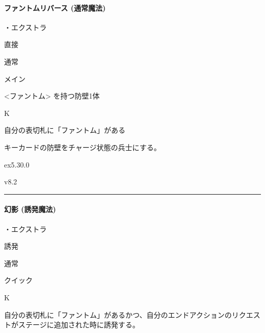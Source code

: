 \documentclass[letterpaper,10pt,dvipdfmx]{sphinxmanual}
\begin{document}
\paragraph{ファントムリバース (通常魔法)}
\label{\detokenize{auto/frameActionlist:act-phantomreverse}}\label{\detokenize{auto/frameActionlist:id42}}
\sphinxAtStartPar
{}

\sphinxAtStartPar
・エクストラ

\sphinxAtStartPar
{} 直接

\sphinxAtStartPar
{} 通常

\sphinxAtStartPar
{} メイン

\sphinxAtStartPar
{} \textless{}ファントム\textgreater{} を持つ防壁1体

\sphinxAtStartPar
{} K

\sphinxAtStartPar
{}

\sphinxAtStartPar
自分の表切札に「ファントム」がある

\sphinxAtStartPar
{}

\sphinxAtStartPar
キーカードの防壁をチャージ状態の兵士にする。

\sphinxAtStartPar
{}  ex5.30.0

\sphinxAtStartPar
{}  v8.2


\bigskip\hrule\bigskip



\paragraph{幻影 (誘発魔法)}
\label{\detokenize{auto/frameActionlist:act-illusion}}\label{\detokenize{auto/frameActionlist:id43}}
\sphinxAtStartPar
{}

\sphinxAtStartPar
・エクストラ

\sphinxAtStartPar
{} 誘発

\sphinxAtStartPar
{} 通常

\sphinxAtStartPar
{} クイック

\sphinxAtStartPar
{} K

\sphinxAtStartPar
{}

\sphinxAtStartPar
自分の表切札に「ファントム」があるかつ、自分のエンドアクションのリクエストがステージに追加された時に誘発する。
\end{document}
